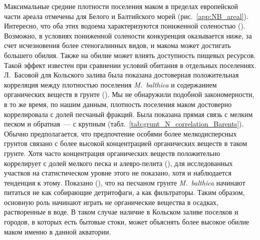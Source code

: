 Максимальные средние плотности поселения маком в пределах европейской части ареала отмечены для Белого и Балтийского морей (рис.~\ref{app:NB_areal}).
Интересно, что оба этих водоема характеризуются пониженной соленостью (\cite{Dobrovolskiy_Zalogin_1982}).
Возможно, в условиях пониженной солености конкуренция оказывается ниже, за счет исчезновения более стеногалинных видов, и макома может достигать большего обилия.
Также на обилие может влиять доступность пищевых ресурсов. 
Такой эффект известен при сравнении условий обитания в отдельных поселениях.
Л.~Басовой для Кольского залива была показана достоверная положительная корреляция между плотностью поселения {\it M.~balthica} и содержанием органических веществ в грунте (\cite{Basova_2004}).   
Мы не обнаружили подобной закономерности, в то же время, по нашим данным, плотность поселения маком достоверно коррелировала с долей песчаный фракций. 
Была показана прямая связь с мелким песком и обратная~--- с крупным (табл.~\ref{tab:grunt_N_correlation_Barents}).
Обычно предполагается, что предпочтение особями более мелкодисперсных грунтов связано с более высокой концентрацией органических веществ в таком грунте. 
Хотя часто концентрация органических веществ положительно коррелирует с долей мелкого песка и алевро-пелита (\cite{Bubnova_1972, Basova_2004}), для исследованных участков на статистическом уровне этого не показано, хотя и наблюдается тенденция к этому. 
Показано (\cite{Olafsson_1989}), что на песчаном грунте {\it M.~balthica} начинают питаться не как собирающие детритофаги, а как фильтраторы. 
Таким образом, основную роль начинают играть не органические вещества в осадках, растворенные в воде. 
В таком случае наличие в Кольском заливе поселков и городов, в которых есть бытовые стоки, может объяснять более высокое обилие маком именно в данной акватории.


